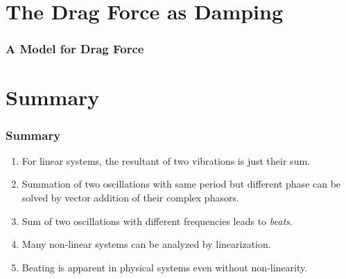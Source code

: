 \documentclass[pdf,hideothersubsections]{beamer}
\begin{document}
\section{The Drag Force as Damping}
\begin{frame}
\frametitle{A Model for Drag Force}

\end{frame}




\section{Summary}
\begin{frame}
\frametitle{Summary}
\begin{enumerate}
\item For linear systems, the resultant of two vibrations is just their sum.
\pause
\item Summation of two oscillations with same period but different phase can be solved by vector addition of their complex phasors.
\pause
\item Sum of two oscillations with different frequencies leads to \emph{beats}.
\pause
\item Many non-linear systems can be analyzed by linearization.
\pause
\item Beating is apparent in physical systems even without non-linearity.
\end{enumerate}
\end{frame}
\end{document}
